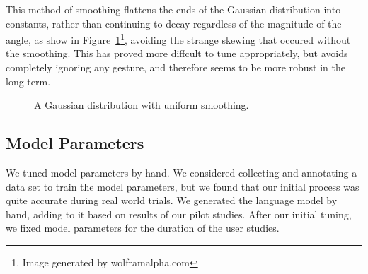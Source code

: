 \documentclass[a4paper, 11pt]{article} %
\begin{document}
This method of smoothing flattens the ends of the Gaussian distribution into constants, rather than continuing to decay regardless of the magnitude of the angle, as show in Figure~\ref{fig:gauss}\footnote{Image generated by wolframalpha.com}, avoiding the strange skewing that occured without the smoothing. This has proved more diffcult to tune appropriately, but avoids completely ignoring any gesture, and therefore seems to be more robust in the long term.
\begin{figure}[h]
\centering
{}
\caption{A Gaussian distribution with uniform smoothing.\label{fig:gauss}}
\end{figure}
\subsection{Model Parameters}
We tuned model parameters by hand. We considered collecting and annotating a data set to train the model parameters, but we found that our initial process was quite accurate during real world trials. We generated the language model by hand, adding to it based on results of our pilot studies. After our initial tuning, we fixed model parameters for the duration of the user studies. 
\end{document}
